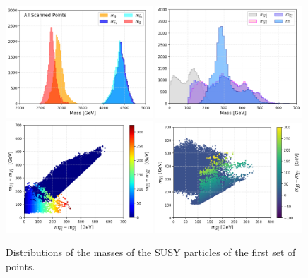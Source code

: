 \documentclass[a4paper,11pt]{article}
\begin{document}
\begin{figure}[!b]
	\centering
	\subfigure
	{ \includegraphics[width=0.49\textwidth]{Fig/Res/Coloured.png}}
	\subfigure
	{\includegraphics[width=0.49\textwidth]{Fig/Res/EW.png}}
	\subfigure
    {\includegraphics[width=0.49\textwidth]{Fig/Res/Diff_EW.png}}	
    \subfigure
        {\includegraphics[width=0.49\textwidth]{Fig/Res/Diff_N2_N1_C_EW.png}}	
    
    
	\caption{Distributions of the masses of the SUSY particles of the first set of points.}
	\label{masses}
\end{figure}
\end{document}
